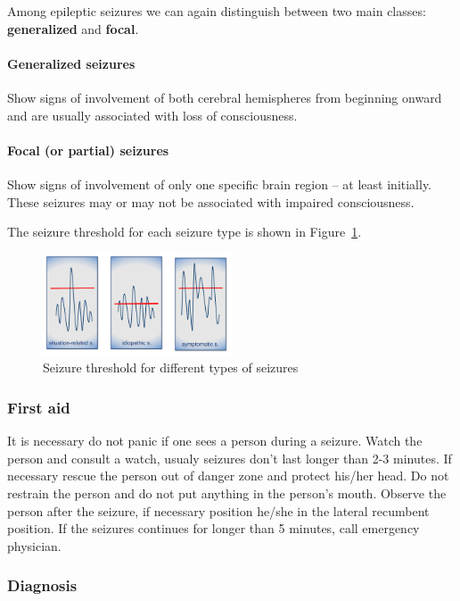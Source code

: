 \documentclass[12pt,article,oneside,a4paper]{memoir}
\begin{document}
Among epileptic seizures we can again distinguish between two main classes:
\textbf{generalized} and \textbf{focal}.

\paragraph{Generalized seizures}
Show signs of involvement of both cerebral hemispheres from beginning onward
and are usually associated with loss of consciousness.

\paragraph{Focal (or partial) seizures}
Show signs of involvement of only one specific brain region – at least
initially. These seizures may or may not be associated with impaired
consciousness.

The seizure threshold for each seizure type is shown in
Figure~\ref{fig:seizure-threshold}.

\begin{figure}
  \centering
  \includegraphics[width=0.5\textwidth]{imgs/seizure-threshold.png}
  \caption{Seizure threshold for different types of seizures}
  \label{fig:seizure-threshold}
\end{figure}

\subsubsection{First aid}
It is necessary do not panic if one sees a person during a seizure. Watch the
person and consult a watch, usualy seizures don't last longer than 2-3 minutes.
If necessary rescue the person out of danger zone and protect his/her head.
Do not restrain the person and do not put anything in the person's mouth.
Observe the person after the seizure, if necessary position he/she in the
lateral recumbent position. If the seizures continues for longer than 5
minutes, call emergency physician.

\subsubsection{Diagnosis}
\end{document}
